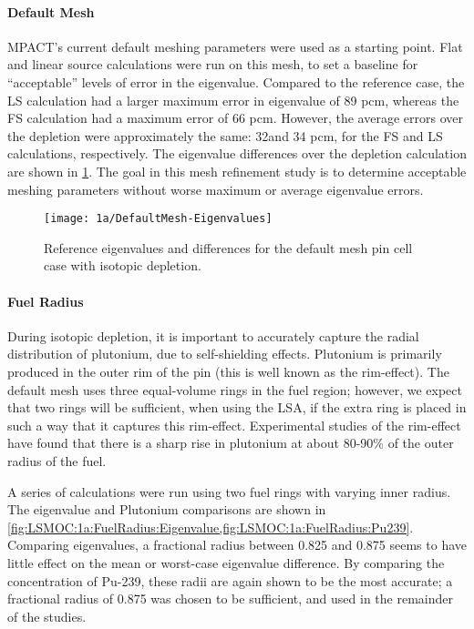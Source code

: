 {{{      \paragraph{Default Mesh}{
        MPACT's current default meshing parameters were used as a starting point.
        Flat and linear source calculations were run on this mesh, to set a baseline for ``acceptable'' levels of error in the eigenvalue.
        Compared to the reference case, the \ac{LS} calculation had a larger maximum error in eigenvalue of 89 \ac{pcm}, whereas the \ac{FS} calculation had a maximum error of 66 \ac{pcm}.
        However, the average errors over the depletion were approximately the same: 32and 34 \ac{pcm}, for the \ac{FS} and \ac{LS} calculations, respectively.
        The eigenvalue differences over the depletion calculation are shown in \cref{fig:LSMOC:1a:DefaultMesh:Eigenvalue}.
        The goal in this mesh refinement study is to determine acceptable meshing parameters without worse maximum or average eigenvalue errors.

        \begin{figure}
            \centering
            \texttt{[image: 1a/DefaultMesh-Eigenvalues]}
            \caption{Reference eigenvalues and differences for the default mesh pin cell case with isotopic depletion. \label{fig:LSMOC:1a:DefaultMesh:Eigenvalue}}
        \end{figure}
      }
      \paragraph{Fuel Radius}{
        During isotopic depletion, it is important to accurately capture the radial distribution of plutonium, due to self-shielding effects.
        Plutonium is primarily produced in the outer rim of the pin (this is well known as the rim-effect).
        The default mesh uses three equal-volume rings in the fuel region; however, we expect that two rings will be sufficient, when using the \ac{LSA}, if the extra ring is placed in such a way that it captures this rim-effect.
        Experimental studies of the rim-effect \cite{Lassmann1994} have found that there is a sharp rise in plutonium at about 80-90\% of the outer radius of the fuel.

        A series of calculations were run using two fuel rings with varying inner radius.
        The eigenvalue and Plutonium comparisons are shown in \cref{fig:LSMOC:1a:FuelRadius:Eigenvalue,fig:LSMOC:1a:FuelRadius:Pu239}.
        Comparing eigenvalues, a fractional radius between 0.825 and 0.875 seems to have little effect on the mean or worst-case eigenvalue difference.
        By comparing the concentration of Pu-239, these radii are again shown to be the most accurate; a fractional radius of 0.875 was chosen to be sufficient, and used in the remainder of the studies.

}}}}
